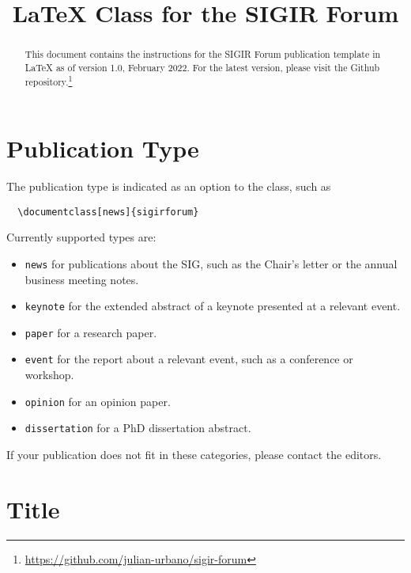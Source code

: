 \documentclass[news]{sigirforum}
\begin{document}
\title{\LaTeX\xspace Class for the SIGIR Forum}


\maketitle 
\begin{abstract}
This document contains the instructions for the SIGIR Forum publication template in \LaTeX\xspace as of version 1.0, February 2022. For the latest version, please visit the Github repository.\footnote{\url{https://github.com/julian-urbano/sigir-forum}}
\end{abstract}

\section{Publication Type}

The publication type is indicated as an option to the class, such as
\begin{verbatim}
  \documentclass[news]{sigirforum}
\end{verbatim}
Currently supported types are:
\begin{itemize}
	\item \texttt{news} for publications about the SIG, such as the Chair's letter or the annual business meeting notes.
	\item \texttt{keynote} for the extended abstract of a keynote presented at a relevant event.
	\item \texttt{paper} for a research paper.
	\item \texttt{event} for the report about a relevant event, such as a conference or workshop.
	\item \texttt{opinion} for an opinion paper.
	\item \texttt{dissertation} for a PhD dissertation abstract.
\end{itemize}

If your publication does not fit in these categories, please contact the editors.

\section{Title}
\end{document}

